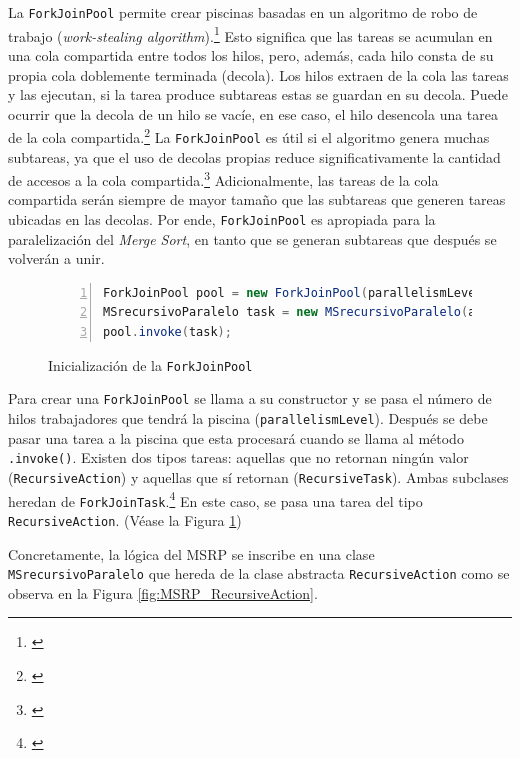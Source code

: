 \documentclass[titlepage]{article}
\begin{document}
La \lstinline|ForkJoinPool| permite crear piscinas basadas en un algoritmo de robo de trabajo (\textit{work-stealing algorithm}).\footnote{\cite{Ramgir2017-mv}} Esto significa que las tareas se acumulan en una cola compartida entre todos los hilos, pero, además, cada hilo consta de su propia cola doblemente terminada (decola). Los hilos extraen de la cola las tareas y las ejecutan, si la tarea produce subtareas estas se guardan en su decola. Puede ocurrir que la decola de un hilo se vacíe, en ese caso, el hilo desencola una tarea de la cola compartida.\footnote{\cite{kumar_2024}} La \lstinline|ForkJoinPool| es útil si el algoritmo genera muchas subtareas, ya que el uso de decolas propias reduce significativamente la cantidad de accesos a la cola compartida.\footnote{\cite{blumofe1999scheduling}} Adicionalmente, las tareas de la cola compartida serán siempre de mayor tamaño que las subtareas que generen tareas ubicadas en las decolas. Por ende, \lstinline|ForkJoinPool| es apropiada para la paralelización del \textit{Merge Sort}, en tanto que se generan subtareas que después se volverán a unir.

\begin{figure}[h]
	\begin{lstlisting}[language=java, frame=single, numbers=left]
ForkJoinPool pool = new ForkJoinPool(parallelismLevel);
MSrecursivoParalelo task = new MSrecursivoParalelo(arr, aux, left, right);
pool.invoke(task);
	\end{lstlisting}
	\caption{Inicialización de la \lstinline{ForkJoinPool}}
	\label{fig:creacionForkJoinPool}
\end{figure}

Para crear una \lstinline|ForkJoinPool| se llama a su constructor y se pasa el número de hilos trabajadores que tendrá la piscina (\lstinline|parallelismLevel|). Después se debe pasar una tarea a la piscina que esta procesará cuando se llama al método \lstinline|.invoke()|. Existen dos tipos tareas: aquellas que no retornan ningún valor (\lstinline|RecursiveAction|) y aquellas que sí retornan (\lstinline|RecursiveTask|). Ambas subclases heredan de \lstinline|ForkJoinTask|.\footnote{\cite{jenkov2024forkjoinpool}} En este caso, se pasa una tarea del tipo \lstinline{RecursiveAction}. (Véase la Figura \ref{fig:creacionForkJoinPool})

Concretamente, la lógica del MSRP se inscribe en una clase \lstinline|MSrecursivoParalelo| que hereda de la clase abstracta \lstinline|RecursiveAction| como se observa en la Figura \ref{fig:MSRP_RecursiveAction}. 
\end{document}
